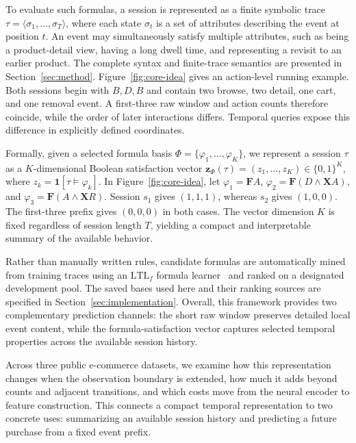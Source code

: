 \documentclass[sigconf,anonymous,nonacm]{acmart}
\newif\ifrevisions
\newcommand{\rev}[1]{\ifrevisions\textcolor{red}{#1}\else#1\fi}
\begin{document}
To evaluate such formulas, a session is represented as a finite symbolic trace $\tau=\langle\sigma_1,\ldots,\sigma_T\rangle$, where each state $\sigma_t$ is a set of attributes describing the event at position $t$. An event may simultaneously satisfy multiple attributes, such as being a product-detail view, having a long dwell time, and representing a revisit to an earlier product. \rev{The complete syntax and finite-trace semantics are presented in Section~\ref{sec:method}.} \rev{Figure~\ref{fig:core-idea} gives an action-level running example. Both sessions begin with $B,D,B$ and contain two browse, two detail, one cart, and one removal event. A first-three raw window and action counts therefore coincide, while the order of later interactions differs. Temporal queries expose this difference in explicitly defined coordinates.}



Formally, given a selected formula basis $\Phi=\{\varphi_1,\ldots,\varphi_K\}$, we represent a session $\tau$ as a $K$-dimensional Boolean satisfaction vector $\mathbf z_\Phi(\tau)=(z_1,\ldots,z_K)\in\{0,1\}^K$, where $z_k=\mathbf1[\tau\models\varphi_k]$. \rev{In Figure~\ref{fig:core-idea}, let $\varphi_1=\mathbf F A$, $\varphi_2=\mathbf F(D\land\mathbf X A)$, and $\varphi_3=\mathbf F(A\land\mathbf X R)$. Session $s_1$ gives $(1,1,1)$, whereas $s_2$ gives $(1,0,0)$. The first-three prefix gives $(0,0,0)$ in both cases.} \rev{The vector dimension $K$ is fixed regardless of session length $T$, yielding a compact and interpretable summary of the available behavior.}

Rather than manually written rules, candidate formulas are automatically mined from training traces using an $\mathrm{LTL}_f$ formula learner~\cite{wan2024end} \rev{and ranked on a designated development pool. The saved bases used here and their ranking sources are specified in Section~\ref{sec:implementation}.} Overall, this framework provides two complementary prediction channels: the short raw window preserves detailed local event content, while \rev{the formula-satisfaction vector captures selected temporal properties across the available session history.}

\rev{Across three public e-commerce datasets, we examine how this representation changes when the observation boundary is extended, how much it adds beyond counts and adjacent transitions, and which costs move from the neural encoder to feature construction. This connects a compact temporal representation to two concrete uses: summarizing an available session history and predicting a future purchase from a fixed event prefix.}
\end{document}

